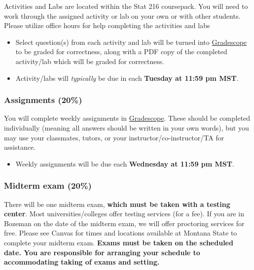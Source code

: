 \documentclass[
]{article}
\providecommand{\tightlist}{%
  \setlength{\itemsep}{0pt}\setlength{\parskip}{0pt}}
\begin{document}
Activities and Labs are located within the Stat 216 coursepack. You will
need to work through the assigned activity or lab on your own or with
other students. Please utilize office hours for help completing the
activities and labs

\begin{itemize}
\tightlist
\item
  Select question(s) from each activity and lab will be turned into
  \href{https://www.gradescope.com/}{Gradescope} to be graded for
  correctness, along with a PDF copy of the completed activity/lab which
  will be graded for correctness.
\item
  Activity/labs will \emph{typically} be due in each \textbf{Tuesday at
  11:59 pm MST}.
\end{itemize}

\subsubsection{Assignments (20\%)}\label{assignments-20}

You will complete weekly assignments in
\href{https://www.gradescope.com/}{Gradescope}. These should be
completed individually (meaning all answers should be written in your
own words), but you may use your classmates, tutors, or your
instructor/co-instructor/TA for assistance.

\begin{itemize}
\tightlist
\item
  Weekly assignments will be due each \textbf{Wednesday at 11:59 pm
  MST}.
\end{itemize}

\subsubsection{Midterm exam (20\%)}\label{midterm-exam-20}

There will be one midterm exam, \textbf{which must be taken with a
testing center}. Most universities/colleges offer testing services (for
a fee). If you are in Bozeman on the date of the midterm exam, we will
offer proctoring services for free. Please see Canvas for times and
locations available at Montana State to complete your midterm exam.
\textbf{Exams must be taken on the scheduled date. You are responsible
for arranging your schedule to accommodating taking of exams and
setting.}
\end{document}
